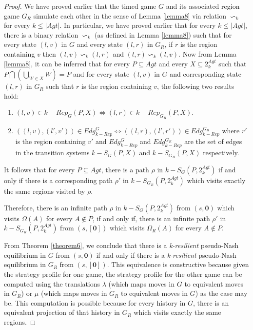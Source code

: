 \begin{proof}
We have proved earlier that the timed game $G$ and its associated region game $G_{R}$ simulate each other in the sense of Lemma \ref{lemma8} via relation $\backsim_{k}$ for every $k \leq \vert Agt \vert$. In particular, we have proved earlier that for every $k \leq \vert Agt \vert$, there is a binary relation $\backsim_{k}$ (as defined in Lemma \ref{lemma8}) such that for every state $(l, v)$ in $G$ and every state $(l, r)$ in $G_{R}$, if $r$ is the region containing $v$ then $(l, v) \backsim_{k} (l, r)$ and $(l, r) \backsim_{k} (l, v)$. Now from Lemma \ref{lemma8}, it can be inferred that for every $P \subseteq Agt$ and every $X \subseteq 2^{Agt}_{k}$ such that $P \bigcap \left( \bigcup \limits_{W \in X}W \right) = P$ and for every state $(l, v)$ in $G$ and corresponding state $(l, r)$ in $G_{R}$ such that $r$ is the region containing $v$, the following two results hold:
\begin{enumerate}
\item $(l, v) \in k-Rep_{G}(P, X) \Leftrightarrow (l, r) \in k-Rep_{G_{R}}(P, X)$.
\item $((l, v), (l', v')) \in Edg_{k-Rep}^{G} \Leftrightarrow ((l, r), (l', r')) \in Edg_{k-Rep}^{G_{R}}$ where $r'$ is the region containing $v'$ and $Edg_{k-Rep}^{G}$ and $Edg_{k-Rep}^{G_{R}}$ are the set of edges in the transition systems $k-S_{G}(P, X)$ and $k-S_{G_{R}}(P, X)$ respectively.
\end{enumerate}

It follows that for every $P \subseteq Agt$, there is a path $\rho$ in $k-S_{G}(P, 2^{Agt}_{k})$ if and only if there is a corresponding path $\rho'$ in $k-S_{G_{R}}(P, 2^{Agt}_{k})$ which visits exactly the same regions visited by $\rho$.

Therefore, there is an infinite path $\rho$ in $k-S_{G}(P, 2^{Agt}_{k})$ from $(s, \textbf{0})$ which visits $\Omega(A)$ for every $A \notin P$, if and only if, there is an infinite path $\rho'$ in $k-S_{G_{R}}(P, 2^{Agt}_{k})$ from $(s, [\textbf{0}])$ which visits $\Omega_{R}(A)$ for every $A \notin P$.

From Theorem \ref{theorem6}, we conclude that there is a \textit{k-resilient} pseudo-Nash equilibrium in $G$ from $(s, \textbf{0})$ if and only if there is a \textit{k-resilient} pseudo-Nash equilibrium in $G_{R}$ from $(s, [\textbf{0}])$. This equivalence is constructive because given the strategy profile for one game, the strategy profile for the other game can be computed using the translations $\lambda$ (which maps moves in $G$ to equivalent moves in $G_{R}$) or $\mu$ (which maps moves in $G_{R}$ to equivalent moves in $G$) as the case may be. This computation is possible because for every history in $G$, there is an equivalent projection of that history in $G_{R}$ which visits exactly the same regions.
\end{proof}

